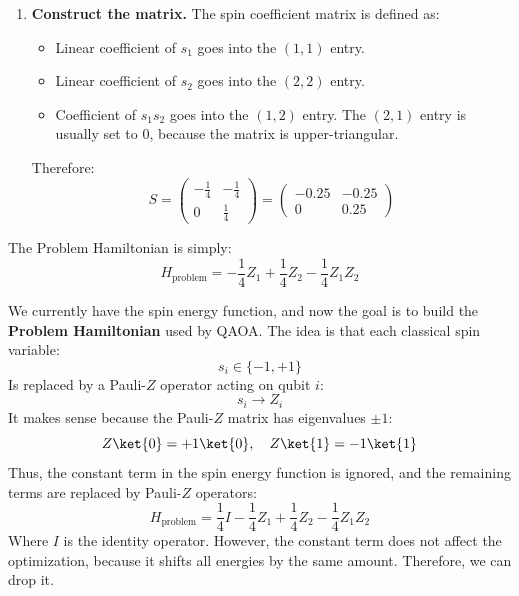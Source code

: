 \begin{enumerate}
    \item \textbf{Construct the matrix.} The spin coefficient matrix is defined as:
        \begin{itemize}
            \item Linear coefficient of $s_1$ goes into the $(1,1)$ entry.
            \item Linear coefficient of $s_2$ goes into the $(2,2)$ entry.
            \item Coefficient of $s_1 s_2$ goes into the $(1,2)$ entry. The $(2,1)$ entry is usually set to $0$, because the matrix is upper-triangular.
        \end{itemize}
        Therefore:
        \begin{equation*}
            \boxed{S =
                \begin{pmatrix}
                    -\frac{1}{4} & -\frac{1}{4} \\
                    0 & \frac{1}{4}
                \end{pmatrix}
                =
                \begin{pmatrix}
                    -0.25 & -0.25 \\
                    0 & 0.25
            \end{pmatrix}}
        \end{equation*}
\end{enumerate}

\highspace
{} The Problem Hamiltonian is simply:
\begin{equation*}
    \boxed{H_{\text{problem}} = -\frac{1}{4}Z_1 + \frac{1}{4}Z_2 - \frac{1}{4}Z_1 Z_2}
\end{equation*}

\begin{deepeningbox}
    We currently have the spin energy function, and now the goal is to build the \textbf{Problem Hamiltonian} used by QAOA. The idea is that each classical spin variable:
    \begin{equation*}
        s_i \in \{-1,+1\}
    \end{equation*}
    Is replaced by a Pauli-$Z$ operator acting on qubit $i$:
    \begin{equation*}
        s_i \to Z_i
    \end{equation*}
    It makes sense because the Pauli-$Z$ matrix has eigenvalues $\pm 1$:
    \begin{equation*}
        Z\ket{0} = +1\ket{0}, \quad Z\ket{1} = -1\ket{1}
    \end{equation*}
    Thus, the constant term in the spin energy function is ignored, and the remaining terms are replaced by Pauli-$Z$ operators:
    \begin{equation*}
        H_{\text{problem}} = \frac{1}{4}I - \frac{1}{4}Z_1 + \frac{1}{4}Z_2 - \frac{1}{4}Z_1 Z_2
    \end{equation*}
    Where $I$ is the identity operator. However, the constant term does not affect the optimization, because it shifts all energies by the same amount. Therefore, we can drop it.
\end{deepeningbox}

